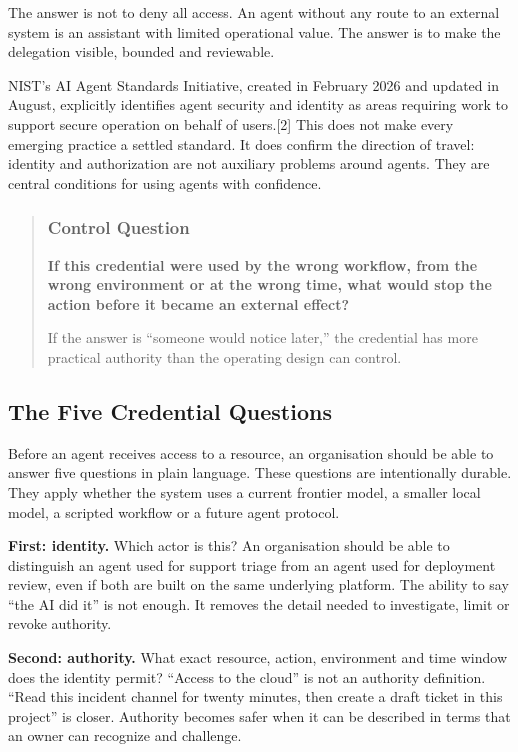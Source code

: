 The answer is not to deny all access. An agent without any route to an
external system is an assistant with limited operational value. The
answer is to make the delegation visible, bounded and reviewable.

NIST's AI Agent Standards Initiative, created in February 2026 and
updated in August, explicitly identifies agent security and identity as
areas requiring work to support secure operation on behalf of
users.{[}2{]} This does not make every emerging practice a settled
standard. It does confirm the direction of travel: identity and
authorization are not auxiliary problems around agents. They are central
conditions for using agents with confidence.

\begin{quote}
\subsubsection{Control Question}\label{control-question}

\textbf{If this credential were used by the wrong workflow, from the
wrong environment or at the wrong time, what would stop the action
before it became an external effect?}

If the answer is ``someone would notice later,'' the credential has more
practical authority than the operating design can control.
\end{quote}

\subsection{The Five Credential
Questions}\label{the-five-credential-questions}

Before an agent receives access to a resource, an organisation should be
able to answer five questions in plain language. These questions are
intentionally durable. They apply whether the system uses a current
frontier model, a smaller local model, a scripted workflow or a future
agent protocol.

\textbf{First: identity.} Which actor is this? An organisation should be
able to distinguish an agent used for support triage from an agent used
for deployment review, even if both are built on the same underlying
platform. The ability to say ``the AI did it'' is not enough. It removes
the detail needed to investigate, limit or revoke authority.

\textbf{Second: authority.} What exact resource, action, environment and
time window does the identity permit? ``Access to the cloud'' is not an
authority definition. ``Read this incident channel for twenty minutes,
then create a draft ticket in this project'' is closer. Authority
becomes safer when it can be described in terms that an owner can
recognize and challenge.

